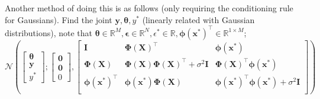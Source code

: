 \documentclass[a4paper, 12pt]{article}
\newcommand{\mat}[1]{\boldsymbol{#1}}
\renewcommand{\vec}[1]{\boldsymbol{#1}}
\newcommand{\mbbr}[0]{\mathbb{R}}
\begin{document}
            Another method of doing this is as follows (only requiring the conditioning rule for Gaussians).
            Find the joint $\vec{y}, \vec{\theta}, y^*$ (linearly related with Gaussian distributions), note that $\vec{\theta} \in \mbbr^M, \vec{\epsilon} \in \mbbr^N, \epsilon^* \in \mbbr, \vec{\phi}(\vec{x^*})^\top \in \mbbr^{1 \times M}$;
            $$\mathcal{N}\left(\begin{bmatrix}
                \vec{\theta} \\
                \vec{y} \\
                y^*
            \end{bmatrix}; \begin{bmatrix}
                \vec{0} \\
                \vec{0} \\
                0
            \end{bmatrix}, \begin{bmatrix}
                \mat{I} & \mat{\Phi}(\mat{X})^\top & \vec{\phi}(\vec{x^*}) \\
                \mat{\Phi}(\mat{X}) & \mat{\Phi}(\mat{X})\mat{\Phi}(\mat{X})^\top + \sigma^2\mat{I} & \mat{\Phi}(\mat{X})^\top\vec{\phi}(\vec{x^*}) \\ %
                \vec{\phi}(\vec{x^*})^\top & \vec{\phi}(\vec{x^*})\mat{\Phi}(\mat{X}) & \vec{\phi}(\vec{x^*})^\top\vec{\phi}(\vec{x^*}) + \sigma^2\mat{I} \\
            \end{bmatrix}\right)$$
\end{document}
